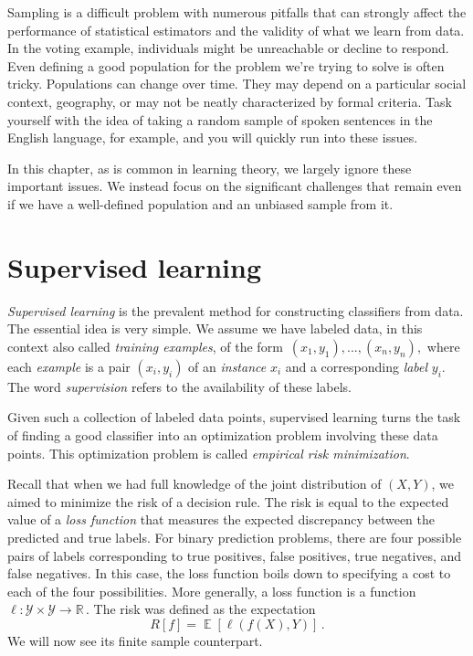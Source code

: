 \documentclass{tufte-book}
\begin{document}
Sampling is a difficult problem with numerous pitfalls that can strongly
affect the performance of statistical estimators and the validity of
what we learn from data. In the voting example, individuals might be
unreachable or decline to respond. Even defining a good population for
the problem we're trying to solve is often tricky. Populations can
change over time. They may depend on a particular social context,
geography, or may not be neatly characterized by formal criteria. Task
yourself with the idea of taking a random sample of spoken sentences in
the English language, for example, and you will quickly run into these
issues.

In this chapter, as is common in learning theory, we largely ignore
these important issues. We instead focus on the significant challenges
that remain even if we have a well-defined population and an unbiased
sample from it.

\hypertarget{supervised-learning}{%
\section{Supervised learning}\label{supervised-learning}}

\emph{Supervised learning} is the prevalent method for constructing
classifiers from data. The essential idea is very simple. We assume we
have labeled data, in this context also called \emph{training examples},
of the form~\((x_1,y_1), ..., (x_n, y_n),\) where each \emph{example} is
a pair \((x_i,y_i)\) of an \emph{instance} \(x_i\) and a corresponding
\emph{label} \(y_i.\) The word \emph{supervision} refers to the
availability of these labels.

Given such a collection of labeled data points, supervised learning
turns the task of finding a good classifier into an optimization problem
involving these data points. This optimization problem is called
\emph{empirical risk minimization}.

Recall that when we had full knowledge of the joint distribution of
\((X,Y)\), we aimed to minimize the risk of a decision rule. The risk is
equal to the expected value of a \emph{loss function} that measures the
expected discrepancy between the predicted and true labels. For binary
prediction problems, there are four possible pairs of labels
corresponding to true positives, false positives, true negatives, and
false negatives. In this case, the loss function boils down to
specifying a cost to each of the four possibilities. More generally, a
loss function is a function
\(\ell\colon\mathcal{Y}\times\mathcal{Y}\to\mathbb{R}\,.\) The risk was
defined as the expectation \[
R[f] = \mathop\mathbb{E}\left[ \ell (f(X), Y) \right]\,.
\] We will now see its finite sample counterpart.
\end{document}
